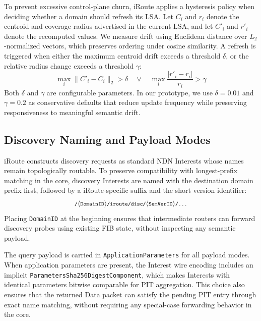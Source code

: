 \documentclass[journal]{IEEEtran}
\newcommand{\sysname}{iRoute}
\newcommand{\PSDC}{\texttt{ParametersSha256Digest\allowbreak Component}}
\begin{document}
To prevent excessive control-plane churn, \sysname{} applies a hysteresis policy when deciding whether a domain should refresh its LSA.
Let $C_i$ and $r_i$ denote the centroid and coverage radius advertised in the current LSA, and let $C'_i$ and $r'_i$ denote the recomputed values.
We measure drift using Euclidean distance over $L_2$-normalized vectors, which preserves ordering under cosine similarity.
A refresh is triggered when either the maximum centroid drift exceeds a threshold $\delta$, or the relative radius change exceeds a threshold $\gamma$:
\begin{equation}
    \max_i \|C'_{i} - C_{i}\|_2 > \delta \quad \lor \quad \max_i \frac{|r'_{i} - r_{i}|}{r_{i}} > \gamma
\end{equation}
Both $\delta$ and $\gamma$ are configurable parameters.
In our prototype, we use $\delta=0.01$ and $\gamma=0.2$ as conservative defaults that reduce update frequency while preserving responsiveness to meaningful semantic drift.

\subsection{Discovery Naming and Payload Modes}
\label{sec:spec_naming}

\sysname{} constructs discovery requests as standard NDN Interests whose names remain topologically routable.
To preserve compatibility with longest-prefix matching in the core, discovery Interests are named with the destination domain prefix first, followed by a \sysname{}-specific suffix and the short version identifier:
{\setlength{\abovedisplayskip}{2pt}\setlength{\belowdisplayskip}{2pt}
\begin{equation*}
\footnotesize
\texttt{/}\allowbreak\langle \texttt{DomainID} \rangle
\texttt{/iroute/disc/}\allowbreak\langle \texttt{SemVerID} \rangle
\texttt{/...}
\end{equation*}}
Placing \texttt{DomainID} at the beginning ensures that intermediate routers can forward discovery probes using existing FIB state, without inspecting any semantic payload.

The query payload is carried in \texttt{ApplicationPara\-meters} for all payload modes. When application parameters are present, the Interest wire encoding includes an implicit \PSDC, which makes Interests with identical parameters bitwise comparable for PIT aggregation.
This choice also ensures that the returned Data packet can satisfy the pending PIT entry through exact name matching, without requiring any special-case forwarding behavior in the core.
\end{document}

